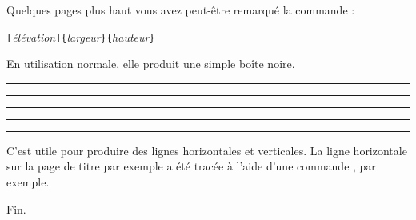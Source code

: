 

Quelques pages plus haut vous avez peut-être remarqué la commande :

\begin{lscommand}
\verb|[|\emph{élévation}\verb|]{|\emph{largeur}\verb|}{|\emph{hauteur}\verb|}|
\end{lscommand}

\noindent En utilisation normale, elle produit une simple boîte
noire. 

\begin{example}
\rule{3mm}{.1pt}%
\rule[-1mm]{5mm}{1cm}%
\rule{3mm}{.1pt}%
\rule[1mm]{1cm}{5mm}%
\rule{3mm}{.1pt}
\end{example}

\noindent C'est utile pour produire des lignes horizontales et
verticales. La ligne horizontale sur la page de titre par exemple a
été tracée à l'aide d'une commande , par exemple.

\bigskip
{\flushright Fin.\par}

\endinput

%

